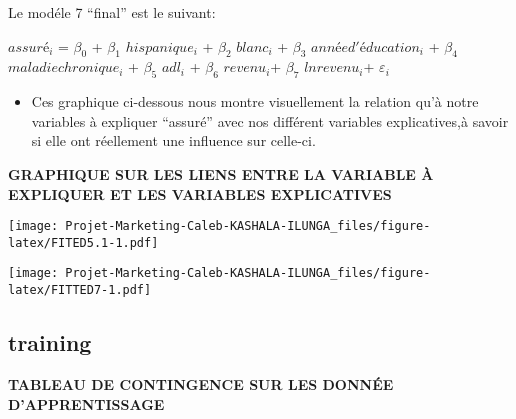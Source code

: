 \documentclass[
  14pt,
  french,
]{article}
\providecommand{\tightlist}{%
  \setlength{\itemsep}{0pt}\setlength{\parskip}{0pt}}
\begin{document}
Le modéle 7 ``final'' est le suivant:

\begin{center}
$assuré_i$ = $\beta_0$  + $\beta_1$ $hispanique_i$ + $\beta_2$ $blanc_i$  + $\beta_{3}$ $année d'éducation_i$ + $\beta_4$ $maladie chronique_i$  + $\beta_{5}$ $adl_i$ + $\beta_{6}$ $revenu_i$+ $\beta_{7}$ $lnrevenu_i$+ $\varepsilon_i$ 
\end{center}

\begin{itemize}
\tightlist
\item
  Ces graphique ci-dessous nous montre visuellement la relation qu'à
  notre variables à expliquer ``assuré'' avec nos différent variables
  explicatives,à savoir si elle ont réellement une influence sur
  celle-ci.
\end{itemize}

\newpage

\textbf{GRAPHIQUE SUR LES LIENS ENTRE LA VARIABLE À EXPLIQUER ET LES
VARIABLES EXPLICATIVES}

\texttt{[image: Projet-Marketing-Caleb-KASHALA-ILUNGA\_files/figure-latex/FITED5.1-1.pdf]}

\texttt{[image: Projet-Marketing-Caleb-KASHALA-ILUNGA\_files/figure-latex/FITTED7-1.pdf]}

\hypertarget{training}{%
\subsection{training}\label{training}}

\textbf{TABLEAU DE CONTINGENCE SUR LES DONNÉE D'APPRENTISSAGE}
\end{document}
